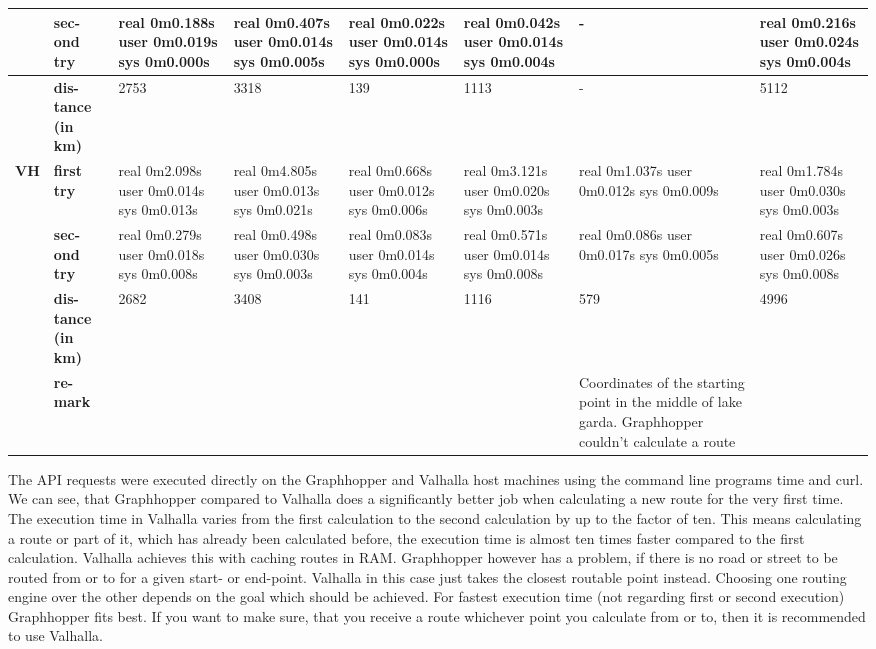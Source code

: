 \begin{longtable}{|p{0.5cm}|p{1.0cm}|p{2.0cm}|p{2.0cm}|p{2.0cm}|p{2.0cm}|p{2.0cm}|p{2.0cm}|}
                                       & \textbf{sec-ond try}       & real 0m0.188s user 0m0.019s sys 0m0.000s & real 0m0.407s user 0m0.014s sys 0m0.005s & real 0m0.022s user 0m0.014s sys 0m0.000s & real 0m0.042s user 0m0.014s sys 0m0.004s & - & real 0m0.216s user 0m0.024s sys 0m0.004s \\ \hline
                                       & \textbf{dis-tance (in km)} & 2753 & 3318 & 139 & 1113 & - & 5112 \\ \hline
\multirow{3}{*}{\textbf{VH}}    & \textbf{first try}        & real 0m2.098s user 0m0.014s sys 0m0.013s & real 0m4.805s user 0m0.013s sys 0m0.021s & real 0m0.668s user 0m0.012s sys 0m0.006s & real 0m3.121s user 0m0.020s sys 0m0.003s & real 0m1.037s user 0m0.012s sys 0m0.009s & real 0m1.784s user 0m0.030s sys 0m0.003s \\ \hline
                                       & \textbf{sec-ond try}       & real 0m0.279s user 0m0.018s sys 0m0.008s & real 0m0.498s user 0m0.030s sys 0m0.003s & real 0m0.083s user 0m0.014s sys 0m0.004s & real 0m0.571s user 0m0.014s sys 0m0.008s & real 0m0.086s user 0m0.017s sys 0m0.005s & real 0m0.607s user 0m0.026s sys 0m0.008s \\ \hline
                                       & \textbf{dis-tance (in km)} & 2682 & 3408 & 141 & 1116 & 579 & 4996 \\ \hline
                                       & \textbf{re-mark}           &  &  &  &  & Coordinates of the starting point in the middle of lake garda. Graphhopper couldn’t calculate a route & 
\end{longtable}



The API requests were executed directly on the Graphhopper and Valhalla host machines using the command line programs time and curl.
We can see, that Graphhopper compared to Valhalla does a significantly better job when calculating a new route for the very first time. The execution time in Valhalla varies from the first calculation to the second calculation by up to the factor of ten. This means calculating a route or part of it, which has already been calculated before, the execution time is almost ten times faster compared to the first calculation. Valhalla achieves this with caching routes in RAM. Graphhopper however has a problem, if there is no road or street to be routed from or to for a given start- or end-point. Valhalla in this case just takes the closest routable point instead.  Choosing one routing engine over the other depends on the goal which should be achieved. For fastest execution time (not regarding first or second execution) Graphhopper fits best. If you want to make sure, that you receive a route whichever point you calculate from or to, then it is recommended to use Valhalla.

